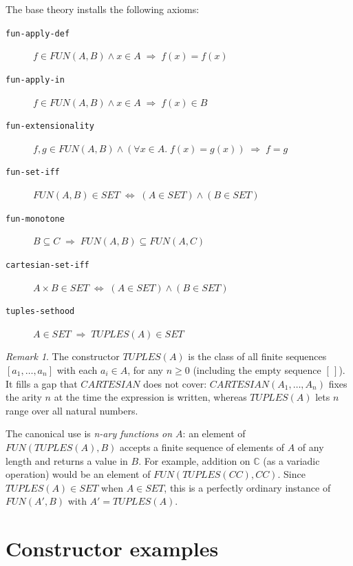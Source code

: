 \documentclass{amsbook}[openany]
\theoremstyle{definition}
\theoremstyle{remark}
\newtheorem{remark}{Remark}[chapter]
\theoremstyle{remark}
\begin{document}
%
The base theory installs the following axioms:

\begin{description}
\item[\texttt{fun-apply-def}]
  $f \in \mathit{FUN}(A,B) \land x \in A \;\Rightarrow\; f(x) = f(x)$
\item[\texttt{fun-apply-in}]
  $f \in \mathit{FUN}(A,B) \land x \in A \;\Rightarrow\; f(x) \in B$
\item[\texttt{fun-extensionality}]
  $f,g \in \mathit{FUN}(A,B) \land (\forall x \in A.\;f(x) = g(x)) \;\Rightarrow\; f = g$
\item[\texttt{fun-set-iff}]
  $\mathit{FUN}(A,B) \in \mathit{SET} \;\Leftrightarrow\; (A \in \mathit{SET}) \land (B \in \mathit{SET})$
\item[\texttt{fun-monotone}]
  $B \subseteq C \;\Rightarrow\; \mathit{FUN}(A,B) \subseteq \mathit{FUN}(A,C)$
\item[\texttt{cartesian-set-iff}]
  $A \times B \in \mathit{SET} \;\Leftrightarrow\; (A \in \mathit{SET}) \land (B \in \mathit{SET})$
\item[\texttt{tuples-sethood}]
  $A \in \mathit{SET} \;\Rightarrow\; \mathit{TUPLES}(A) \in \mathit{SET}$
\end{description}

\begin{remark}
The constructor $\mathit{TUPLES}(A)$ is the class of all finite sequences
$[a_1, \ldots, a_n]$ with each $a_i \in A$, for any $n \ge 0$ (including
the empty sequence $[\,]$).  It fills a gap that $\mathit{CARTESIAN}$ does
not cover: $\mathit{CARTESIAN}(A_1, \ldots, A_n)$ fixes the arity $n$ at
the time the expression is written, whereas $\mathit{TUPLES}(A)$ lets $n$
range over all natural numbers.

The canonical use is \emph{n-ary functions on $A$}: an element of
$\mathit{FUN}(\mathit{TUPLES}(A), B)$ accepts a finite sequence of elements
of $A$ of any length and returns a value in $B$.  For example, addition on
$\mathbb{C}$ (as a variadic operation) would be an element of
$\mathit{FUN}(\mathit{TUPLES}(\mathit{CC}), \mathit{CC})$.
Since $\mathit{TUPLES}(A) \in \mathit{SET}$ when $A \in \mathit{SET}$,
this is a perfectly ordinary instance of $\mathit{FUN}(A', B)$ with
$A' = \mathit{TUPLES}(A)$.
\end{remark}

\section{Constructor examples}
\label{sec:constructor-examples}
\end{document}
